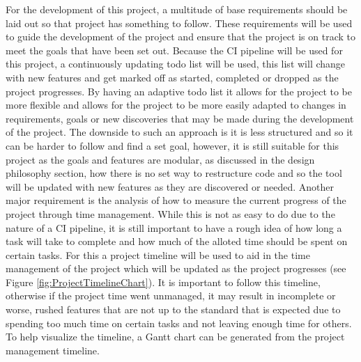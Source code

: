 For the development of this project, a multitude of base requirements should be laid out so that project has something to follow. These requirements will be used to guide the development of the project and ensure that the project is on track to meet the goals that have been set out.
Because the CI pipeline will be used for this project, a continuously updating todo list will be used, this list will change with new features and get marked off as started, completed or dropped as the project progresses. By having an adaptive todo list it allows for the project to be more flexible and allows for the project to be more easily adapted to changes in requirements, goals or new discoveries that may be made during the development of the project. The downside to such an approach is it is less structured and so it can be harder to follow and find a set goal, however, it is still suitable for this project as the goals and features are modular, as discussed in the design philosophy section, how there is no set way to restructure code and so the tool will be updated with new features as they are discovered or needed.
Another major requirement is the analysis of how to measure the current progress of the project through time management. While this is not as easy to do due to the nature of a CI pipeline, it is still important to have a rough idea of how long a task will take to complete and how much of the alloted time should be spent on certain tasks. For this a project timeline will be used to aid in the time management of the project which will be updated as the project progresses (see Figure \ref{fig:ProjectTimelineChart}). It is important to follow this timeline, otherwise if the project time went unmanaged, it may result in incomplete or worse, rushed features that are not up to the standard that is expected due to spending too much time on certain tasks and not leaving enough time for others. To help visualize the timeline, a Gantt chart can be generated from the project management timeline.

